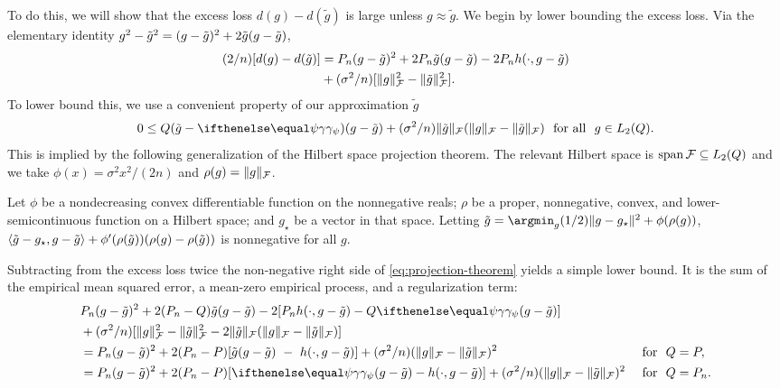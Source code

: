 To do this, we will show that the excess loss $d(g) - d(\tilde g)$ is large
unless $g \approx \tilde g$. We begin by lower bounding the excess loss.
Via the elementary identity $g^2 - \tilde g^2 = (g-\tilde g)^2 + 2\tilde{g} (g-\tilde{g})$,
\begin{equation}
\label{eq:concrete-dual}
\begin{aligned}
(2/n)[d(g) - d(\tilde g)] 
&= \Pn (g-\tilde g)^2 + 2\Pn \tilde g (g - \tilde g) - 2 \Pn h(\cdot, g - \tilde g)\\
& + (\sigma^2/n)[\norm{g}_{\F}^2 - \norm{\tilde g}_{\F}^2].
\end{aligned} 
\end{equation}
To lower bound this, we use a convenient property of our approximation $\tilde g$
\begin{equation}
\label{eq:projection-theorem}
0 \le  Q (\tilde g - \riesz[\psi]) (g - \tilde g) + (\sigma^2/n)\norm{\tilde g}_{\F}(\norm{g}_{\F} - \norm{\tilde g}_{\F})
 \ \text{ for all }\  g \in L_2(Q). 
\end{equation}
This is implied by the following generalization of the Hilbert space projection theorem.
The relevant Hilbert space is $\operatorname*{span}\mathcal{F} \subseteq L_2(Q)$ 
and we take $\phi(x)=\sigma^2 x^2 /(2n)$ and $\rho(g) = \lVert g\rVert_{\mathcal{F}}$.
\begin{lemm}
\label{lemma:projection-theorem}
Let $\phi$ be a nondecreasing convex differentiable function on the nonnegative reals;
$\rho$ be a proper, nonnegative, convex, and lower-semicontinuous function on a Hilbert space;
and $g_{\star}$ be a vector in that space.
Letting $\tilde g = \argmin_{g}  (1/2)\norm{g - g_{\star}}^2 + \phi(\rho(g))$,
$\langle  \tilde g - g_{\star}, g - \tilde g\rangle + \phi'(\rho(\tilde g))(\rho(g) - \rho(\tilde g))$
is nonnegative for all $g$.
\end{lemm}
Subtracting from the excess loss twice the non-negative right side of \eqref{eq:projection-theorem} yields a simple lower bound.
It is the sum of the empirical mean squared error, a mean-zero empirical process, and a regularization term:
\begin{equation*}
\begin{aligned}
&\Pn (g-\tilde g)^2 + 2(\Pn-Q) \tilde g (g - \tilde g) - 2[\Pn h(\cdot, g - \tilde g) -  Q \riesz[\psi](g-\tilde g)] && \\
& + (\sigma^2/n)[\norm{g}_{\F}^2 - \norm{\tilde g}_{\F}^2 - 2\norm{\tilde g}_{\F}(\norm{g}_{\F}-\norm{\tilde g}_{\F}) ] && \\
&= \Pn (g-\tilde g)^2 + 2(\Pn-\P) [\tilde g (g - \tilde g) \  - \ h(\cdot, g - \tilde g)] + (\sigma^2/n)(\norm{g}_{\F} - \norm{\tilde g}_{\F})^2 && \text{ for }\ Q=\P, \\
&= \Pn (g-\tilde g)^2 + 2(\Pn-\P) [\riesz[\psi](g-\tilde g) - h(\cdot, g - \tilde g)] + (\sigma^2/n)(\norm{g}_{\F} - \norm{\tilde g}_{\F})^2 && \text{ for }\ Q=\Pn. \\
\end{aligned} 
\end{equation*}
